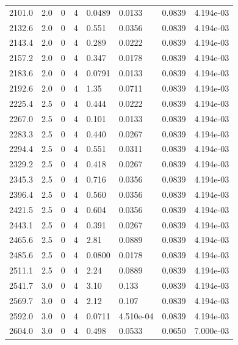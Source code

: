 \documentclass[preview]{standalone}
\begin{document}
{{{{\begin{tabular}{L{1.2cm}C{1.2cm} C{0.3cm}C{0.5cm} C{1.4cm}C{1.4cm} C{1.4cm}C{1.4cm}}
  2101.0  &   2.0  & 0     &  4 &  0.0489  & 0.0133  & 0.0839 &  4.194e-03   \\ 
  2132.6  &   2.0  & 0     &  4 &  0.551  & 0.0356  & 0.0839 &  4.194e-03   \\ 
  2143.4  &   2.0  & 0     &  4 &  0.289  & 0.0222  & 0.0839 &  4.194e-03   \\ 
  2157.2  &   2.0  & 0     &  4 &  0.347  & 0.0178  & 0.0839 &  4.194e-03   \\ 
  2183.6  &   2.0  & 0     &  4 &  0.0791  & 0.0133  & 0.0839 &  4.194e-03   \\ 
  2192.6  &   2.0  & 0     &  4 &  1.35  & 0.0711  & 0.0839 &  4.194e-03   \\ 
  2225.4  &   2.5  & 0     &  4 &  0.444  & 0.0222  & 0.0839 &  4.194e-03   \\ 
  2267.0  &   2.5  & 0     &  4 &  0.101  & 0.0133  & 0.0839 &  4.194e-03   \\ 
  2283.3  &   2.5  & 0     &  4 &  0.440  & 0.0267  & 0.0839 &  4.194e-03   \\ 
  2294.4  &   2.5  & 0     &  4 &  0.551  & 0.0311  & 0.0839 &  4.194e-03   \\ 
  2329.2  &   2.5  & 0     &  4 &  0.418  & 0.0267  & 0.0839 &  4.194e-03   \\ 
  2345.3  &   2.5  & 0     &  4 &  0.716  & 0.0356  & 0.0839 &  4.194e-03   \\ 
  2396.4  &   2.5  & 0     &  4 &  0.560  & 0.0356  & 0.0839 &  4.194e-03   \\ 
  2421.5  &   2.5  & 0     &  4 &  0.604  & 0.0356  & 0.0839 &  4.194e-03   \\ 
  2443.1  &   2.5  & 0     &  4 &  0.391  & 0.0267  & 0.0839 &  4.194e-03   \\ 
  2465.6  &   2.5  & 0     &  4 &  2.81  & 0.0889  & 0.0839 &  4.194e-03   \\ 
  2485.6  &   2.5  & 0     &  4 &  0.0800  & 0.0178  & 0.0839 &  4.194e-03   \\ 
  2511.1  &   2.5  & 0     &  4 &  2.24  & 0.0889  & 0.0839 &  4.194e-03   \\ 
  2541.7  &   3.0  & 0     &  4 &  3.10  & 0.133  & 0.0839 &  4.194e-03   \\ 
  2569.7  &   3.0  & 0     &  4 &  2.12  & 0.107  & 0.0839 &  4.194e-03   \\ 
  2592.0  &   3.0  & 0     &  4 &  0.0711  & 4.510e-04  & 0.0839 &  4.194e-03   \\ 
  2604.0  &   3.0  & 0     &  4 &  0.498  & 0.0533  & 0.0650 &  7.000e-03   \\ 

\end{tabular}}}}}
\end{document}

